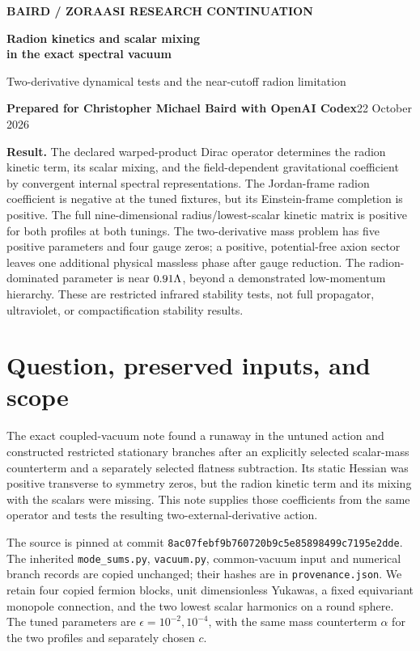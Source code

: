 \documentclass[11pt,letterpaper]{article}
\begin{document}
\thispagestyle{plain}
{\small\bfseries\color{teal} BAIRD / ZORAASI RESEARCH CONTINUATION}\par
{\LARGE\bfseries\color{navy} Radion kinetics and scalar mixing\\ in the exact spectral vacuum}\par
{\large Two-derivative dynamical tests and the near-cutoff radion limitation}\par
\textbf{Prepared for Christopher Michael Baird with OpenAI Codex}\hfill 22 October 2026

\colorbox{pale}{\parbox{\dimexpr\linewidth-2\fboxsep\relax}{\textbf{Result.} The declared warped-product Dirac operator determines the radion kinetic term, its scalar mixing, and the field-dependent gravitational coefficient by convergent internal spectral representations. The Jordan-frame radion coefficient is negative at the tuned fixtures, but its Einstein-frame completion is positive. The full nine-dimensional radius/lowest-scalar kinetic matrix is positive for both profiles at both tunings. The two-derivative mass problem has five positive parameters and four gauge zeros; a positive, potential-free axion sector leaves one additional physical massless phase after gauge reduction. The radion-dominated parameter is near $0.91\Lambda$, beyond a demonstrated low-momentum hierarchy. These are restricted infrared stability tests, not full propagator, ultraviolet, or compactification stability results.}}

\section{Question, preserved inputs, and scope}

The exact coupled-vacuum note \cite{vacuum} found a runaway in the untuned action and constructed restricted stationary branches after an explicitly selected scalar-mass counterterm and a separately selected flatness subtraction. Its static Hessian was positive transverse to symmetry zeros, but the radion kinetic term and its mixing with the scalars were missing. This note supplies those coefficients from the same operator and tests the resulting two-external-derivative action.

The source is pinned at commit \texttt{8ac07febf9b760720b9c5e85898499c7195e2dde}. The inherited \texttt{mode\_sums.py}, \texttt{vacuum.py}, common-vacuum input and numerical branch records are copied unchanged; their hashes are in \texttt{provenance.json}. We retain four copied fermion blocks, unit dimensionless Yukawas, a fixed equivariant monopole connection, and the two lowest scalar harmonics on a round sphere. The tuned parameters are $\epsilon=10^{-2},10^{-4}$, with the same mass counterterm $\alpha$ for the two profiles and separately chosen $c$.
\end{document}
